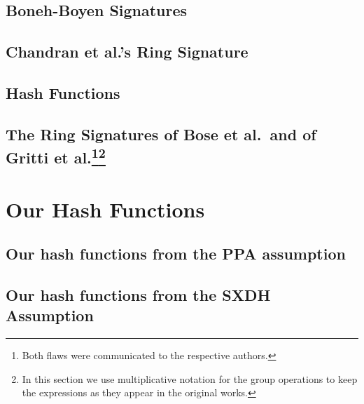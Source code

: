 \documentclass{llncs}
\begin{document}
		

	\subsection{Boneh-Boyen Signatures} \label{sec:bbs}
    
            

      	\subsection{Chandran et al.'s Ring Signature}
	
       		

	\subsection{Hash Functions} \label{sec:hash}

		

	\subsection{The Ring Signatures of Bose et al.~and of Gritti et al.\protect\footnote{Both flaws were communicated to the respective authors.}\protect\footnote{In this section we use multiplicative notation for the group operations to keep the expressions as they appear in the original works.}}\label{sec:rs-flawed}
    
        	 

    \section{Our Hash Functions} \label{sec:hf}
    
    	
    	
    	\subsection{Our hash functions from the PPA assumption} \label{sec:hf-ppa}
    	
    		

	\subsection{Our hash functions from the SXDH Assumption} \label{sec:hf-sxdh}
\end{document}
